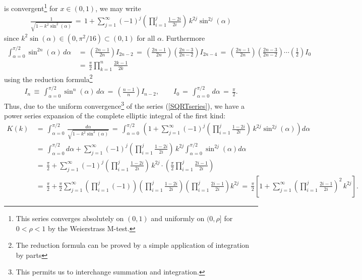 \documentclass{tjwNOTES}
\begin{document}
is convergent\footnote{This series converges absolutely on $(0,1)$ and uniformly on $(0,\rho]$ for $0<\rho<1$ by the Weierstrass M-test.} for $x\in(0,1)$, we may write
\begin{align}\label{SQRTseries}
	\frac{1}{\sqrt{1-k^{2}\sin^{2}(\alpha)}} \,=\, 1+\sum_{j=1}^{\infty}(-1)^{j}\left(\prod_{i=1}^{j}\frac{1-2i}{2i}\right)\,k^{2j}\sin^{2j}(\alpha)
\end{align}
since $k^{2}\sin(\alpha)\in(0,\pi^{2}/16)\subset(0,1)$ for all $\alpha$. Furthermore
\begin{align*}
	\int_{\alpha=0}^{\pi/2}\sin^{2n}(\alpha)\,d\alpha &\,=\, \left(\frac{2n-1}{2n}\right)I_{2n-2} \,=\, \left(\frac{2n-1}{2n}\right)\left(\frac{2n-3}{2n-2}\right)I_{2n-4} \,=\, \left(\frac{2n-1}{2n}\right)\left(\frac{2n-3}{2n-2}\right)\cdots\left(\frac{1}{2}\right)I_{0} \\[0.2cm]
		&\,=\,\frac{\pi}{2} \prod_{k=1}^{n}\frac{2k-1}{2k} 
\end{align*}
using the reduction formula\footnote{The reduction formula can be proved by a simple application of integration by parts} 
\begin{align*}
	I_{n} \,\equiv\, \int_{\alpha=0}^{\pi/2}\sin^{n}(\alpha)\,d\alpha \,=\, \left(\frac{n-1}{n}\right)I_{n-2}, \qquad I_{0} \,=\, \int_{\alpha=0}^{\pi/2}\,d\alpha \,=\, \frac{\pi}{2}.
\end{align*}
Thus, due to the uniform convergence\footnote{This permits us to interchange summation and integration.} of the series (\ref{SQRTseries}), we have a power series expansion of the complete elliptic integral of the first kind:
\begin{align*}
	K(k) &\,=\, \int_{\alpha=0}^{\pi/2}\,\frac{d\alpha}{\sqrt{ 1- k^{2}\sin^{2}(\alpha)}} \,=\, \int_{\alpha=0}^{\pi/2}\,\left(1+\sum_{j=1}^{\infty}(-1)^{j}\left(\prod_{i=1}^{j}\frac{1-2i}{2i}\right)\,k^{2j}\sin^{2j}(\alpha)\right)d\alpha \\[0.2cm]
	&\,=\, \int_{\alpha=0}^{\pi/2}d\alpha + \sum_{j=1}^{\infty}(-1)^{j}\left(\prod_{i=1}^{j}\frac{1-2i}{2i}\right)\,k^{2j}\int_{\alpha=0}^{\pi/2}\sin^{2j}(\alpha)d\alpha \\[0.2cm]
	&\,=\, \frac{\pi}{2} + \sum_{j=1}^{\infty}(-1)^{j}\left(\prod_{i=1}^{j}\frac{1-2i}{2i}\right)\,k^{2j}\cdot\left(\frac{\pi}{2} \prod_{i=1}^{j}\frac{2i-1}{2i}\right) \\[0.2cm]
	&\,=\, \frac{\pi}{2} + \frac{\pi}{2}\sum_{j=1}^{\infty}\left(\prod_{i=1}^{j}(-1)\right)\left(\prod_{i=1}^{j}\frac{1-2i}{2i}\right)\left(\prod_{i=1}^{j}\frac{2i-1}{2i}\right)k^{2j} \,=\, \frac{\pi}{2}\left[1+\sum_{j=1}^{\infty}\left(\prod_{i=1}^{j}\frac{2i-1}{2i}\right)^{2}\,k^{2j} \right].
\end{align*}
\end{document}
